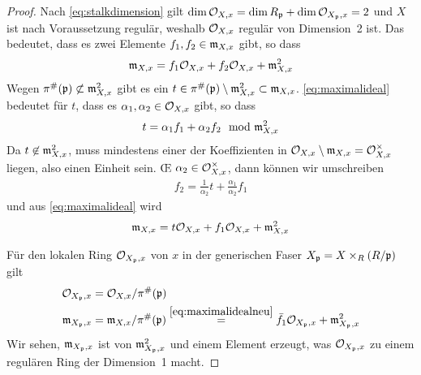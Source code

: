 \documentclass[german]{scrreprt}
\begin{document}
\begin{Lemma}
\begin{proof}
    Nach \ref{eq:stalkdimension} gilt
    $\dim\mathcal{O}_{X,x}=\dim R_{\mathfrak{p}}+\dim\mathcal{O}_{X_{\mathfrak{p}},x}=2$ und $X$ ist nach
    Voraussetzung regulär, weshalb $\mathcal{O}_{X,x}$ regulär von Dimension~2
    ist. Das bedeutet, dass es zwei Elemente $f_1, f_2\in\mathfrak{m}_{X,x}$
    gibt, so dass
    \begin{gather}\label{eq:maximalideal}
      \mathfrak{m}_{X,x} = f_1\mathcal{O}_{X,x} + f_2\mathcal{O}_{X,x} + \mathfrak{m}_{X,x}^2
    \end{gather}
    Wegen $\pi^\#(\mathfrak{p})\not\subset\mathfrak{m}_{X,x}^2$ gibt es ein
    $t\in\pi^\#(\mathfrak{p})\setminus\mathfrak{m}_{X,x}^2\subset\mathfrak{m}_{X,x}$.
    \eqref{eq:maximalideal} bedeutet für $t$, dass es $\alpha_1,
    \alpha_2\in\mathcal{O}_{X,x}$ gibt, so dass
    \begin{gather*}
      t = \alpha_1 f_1 + \alpha_2 f_2 \mod {\mathfrak{m}}_{X,x}^2
    \end{gather*}
    Da $t\not\in\mathfrak{m}_{X,x}^2$, muss mindestens einer der Koeffizienten
    in $\mathcal{O}_{X,x}\setminus\mathfrak{m}_{X,x}=\mathcal{O}_{X,x}^\times$ liegen, also einen
    Einheit sein. \OE{} $\alpha_2\in\mathcal{O}_{X,x}^\times$, dann können wir
    umschreiben
    \begin{gather*}
      f_2 = \frac{1}{\alpha_2}t + \frac{\alpha_1}{\alpha_2}f_1 
    \end{gather*}
    und aus \eqref{eq:maximalideal} wird
    \begin{gather}\label{eq:maximalidealneu}
      \mathfrak{m}_{X,x} = t\mathcal{O}_{X,x} + f_1\mathcal{O}_{X,x} + \mathfrak{m}_{X,x}^2
    \end{gather}

    Für den lokalen Ring $\mathcal{O}_{X_{\mathfrak{p}},x}$ von $x$ in der generischen
    Faser $X_{\mathfrak{p}} = X\times_R (R/\mathfrak{p})$ gilt
    \begin{align*}
      \mathcal{O}_{X_{\mathfrak{p}},x} &= \mathcal{O}_{X,x}/\pi^\#(\mathfrak{p})\\
      \mathfrak{m}_{X_{\mathfrak{p}},x} &= \mathfrak{m}_{X,x}/\pi^\#(\mathfrak{p})
                    \overset{\eqref{eq:maximalidealneu}}{=}
                    \bar f_1\mathcal{O}_{X_{\mathfrak{p}},x} + \mathfrak{m}_{X_{\mathfrak{p}},x}^2
    \end{align*}
    Wir sehen, $\mathfrak{m}_{X_{\mathfrak{p}},x}$ ist von $\mathfrak{m}_{X_{\mathfrak{p}},x}^2$ und einem Element
    erzeugt, was $\mathcal{O}_{X_{\mathfrak{p}},x}$ zu einem regulären Ring der Dimension~1
    macht.
  \end{proof}
\end{Lemma}

\end{document}

